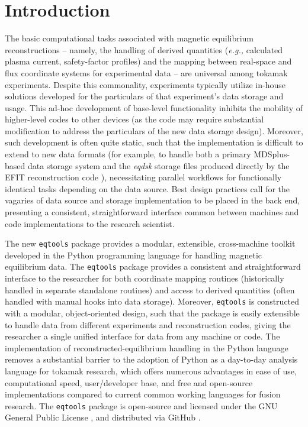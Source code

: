 \documentclass[12pt,floatfix,showpacs]{revtex4-1}
\newcommand{\eg}{\emph{e.g., }}
\newcommand{\eqtools}{\texttt{eqtools}\xspace}
\begin{document}
\section{Introduction}\label{sec:intro}

The basic computational tasks associated with magnetic equilibrium reconstructions -- namely, the handling of derived quantities (\eg calculated plasma current, safety-factor profiles) and the mapping between real-space and flux coordinate systems for experimental data -- are universal among tokamak experiments.  
Despite this commonality, experiments typically utilize in-house solutions developed for the particulars of that experiment's data storage and usage.  
This ad-hoc development of base-level functionality inhibits the mobility of higher-level codes to other devices (as the code may require substantial modification to address the particulars of the new data storage design).  
Moreover, such development is often quite static, such that the implementation is difficult to extend to new data formats (for example, to handle both a primary MDSplus-based data storage system \cite{MDSplus} and the \emph{eqdsk} storage files produced directly by the EFIT reconstruction code \cite{Lao1985}), necessitating parallel workflows for functionally identical tasks depending on the data source.  
Best design practices call for the vagaries of data source and storage implementation to be placed in the back end, presenting a consistent, straightforward interface common between machines and code implementations to the research scientist.

The new \eqtools package provides a modular, extensible, cross-machine toolkit developed in the Python programming language for handling magnetic equilibrium data.  
The \eqtools package provides a consistent and straightforward interface to the researcher for both coordinate mapping routines (historically handled in separate standalone routines) and access to derived quantities (often handled with manual hooks into data storage).  
Moreover, \eqtools is constructed with a modular, object-oriented design, such that the package is easily extensible to handle data from different experiments and reconstruction codes, giving the researcher a single unified interface for data from any machine or code.  
The implementation of reconstructed-equilibrium handling in the Python language removes a substantial barrier to the adoption of Python as a day-to-day analysis language for tokamak research, which offers numerous advantages in ease of use, computational speed, user/developer base, and free and open-source implementations compared to current common working languages for fusion research.  The \eqtools package is open-source and licensed under the GNU General Public License \cite{GPL}, and distributed via GitHub \cite{eqtools_git,eqtools_readthedocs}.
\end{document}
